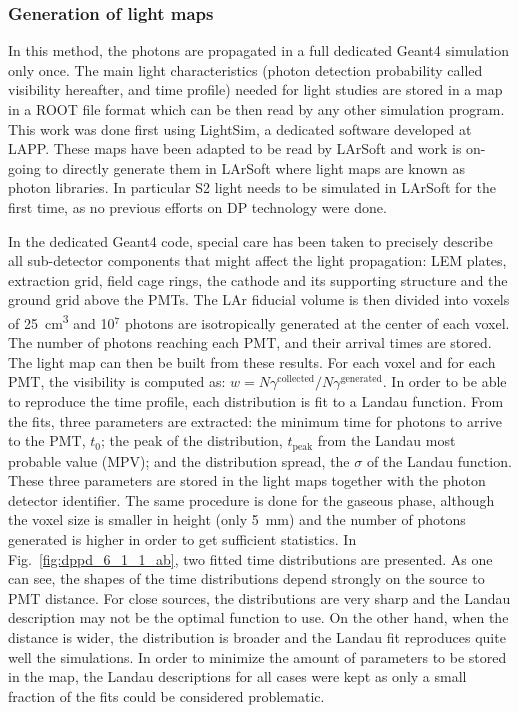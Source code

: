 \subsubsection{Generation of light maps}
\label{subsec:fddp-pd-6.1.1}

In this method, the photons are propagated in a full dedicated Geant4 simulation only once. The main light characteristics (photon detection probability called visibility hereafter, and time profile) needed for light studies are stored in a map in a ROOT \cite{root} file format which can be then read by any other simulation program. This work was done first using LightSim, a dedicated software developed at LAPP. These maps have been adapted to be read by LArSoft and work is on-going to directly generate them in LArSoft where light maps are known as photon libraries. In particular S2 light needs to be simulated in LArSoft for the first time, as no previous efforts on DP technology were done.

In the dedicated Geant4 code, special care has been taken to precisely describe all sub-detector components that might affect the light propagation: LEM plates, extraction grid, field cage rings, the cathode and its supporting structure and the ground grid above the PMTs. The LAr fiducial volume is then divided into voxels of \SI{25}{cm^3} and \num{10}$^7$ photons are isotropically generated at the center of each voxel. The number of photons reaching each PMT, and their arrival times are stored. The light map can then be built from these results. For each voxel and for each PMT, the visibility is computed as: $w=N\gamma^{\textrm{collected}}/N\gamma^{\textrm{generated}}$. In order to be able to reproduce the time profile, each distribution is fit to a Landau function. From the fits, three parameters are extracted: the minimum time for photons to arrive to the PMT, $t_0$; the peak of the distribution, $t_{\textrm{peak}}$ from the Landau most probable value (MPV); and the distribution spread, the $\sigma$ of the Landau function. These three parameters are stored in the light maps together with the photon detector identifier. The same procedure is done for the gaseous phase, although the voxel size is smaller in height (only \SI{5}{mm}) and the number of photons generated is higher in order to get sufficient statistics. In Fig.~\ref{fig:dppd_6_1_1_ab}, two fitted time distributions are presented. As one can see, the shapes of the time distributions depend strongly on the source to PMT distance. For close sources, the distributions are very sharp and the Landau description may not be the optimal function to use. On the other hand, when the distance is wider, the distribution is broader and the Landau fit reproduces quite well the simulations. In order to minimize the amount of parameters to be stored in the map, the Landau descriptions for all cases were kept as only a small fraction of the fits could be considered problematic.

